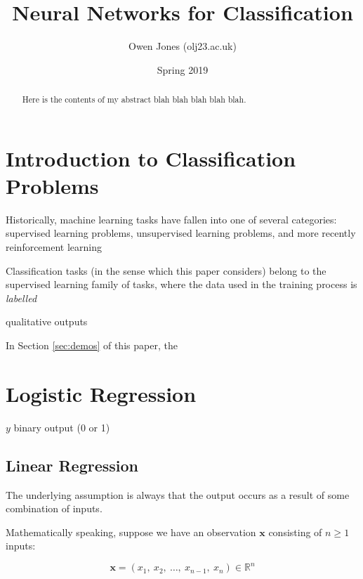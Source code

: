 \documentclass{article}[11pt]
\begin{document}
	
	
	\title{Neural Networks for Classification}
	\author{Owen Jones (olj23\@bath.ac.uk)}
	\date{Spring 2019}
	\maketitle


\begin{abstract}
    
    
	Here is the contents of my abstract blah blah blah blah blah.
\end{abstract}



\section{Introduction to Classification Problems}

    Historically, machine learning tasks have fallen into one of several categories: supervised learning problems, unsupervised learning problems, and more recently reinforcement learning
    
    Classification tasks (in the sense which this paper considers) belong to the supervised learning family of tasks, where the data used in the training process is \textit{labelled}
    
    qualitative outputs
    
    In Section \ref{sec:demos} of this paper, the 


\section{Logistic Regression}


    $y$ binary output (0 or 1)


    \subsection{Linear Regression}
        
        The underlying assumption is always that the output occurs as a result of some combination of inputs.
        
        Mathematically speaking, suppose we have an observation $\mathbf{x}$ consisting of $n \geq 1$ inputs:
        
        $$
        \mathbf{x} = (x_1, \ x_2, \ \ldots, \ x_{n-1}, \ x_n) \in \mathbb{R}^n
        $$
        
\end{document}
